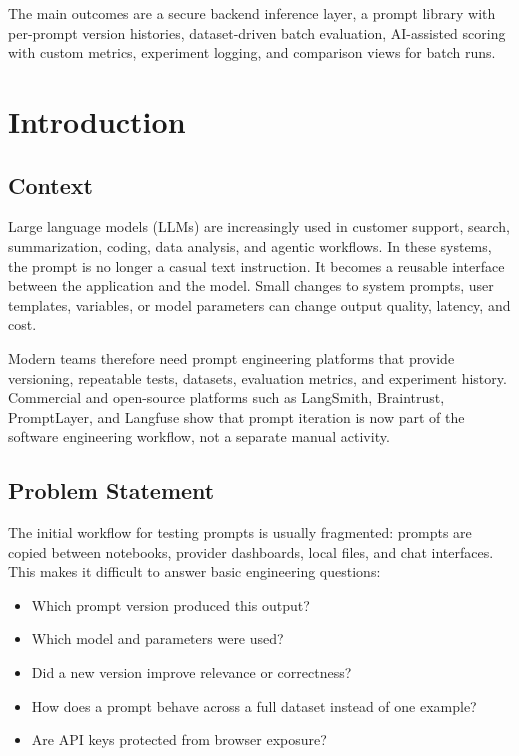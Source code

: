 \documentclass[12pt,a4paper]{report}
\begin{document}
The main outcomes are a secure backend inference layer, a prompt library with per-prompt version histories, dataset-driven batch evaluation, AI-assisted scoring with custom metrics, experiment logging, and comparison views for batch runs.

\tableofcontents
\listoffigures
\listoftables
\clearpage
{}

\chapter{Introduction}

\section{Context}
Large language models (LLMs) are increasingly used in customer support, search, summarization, coding, data analysis, and agentic workflows. In these systems, the prompt is no longer a casual text instruction. It becomes a reusable interface between the application and the model. Small changes to system prompts, user templates, variables, or model parameters can change output quality, latency, and cost.

Modern teams therefore need prompt engineering platforms that provide versioning, repeatable tests, datasets, evaluation metrics, and experiment history. Commercial and open-source platforms such as LangSmith, Braintrust, PromptLayer, and Langfuse show that prompt iteration is now part of the software engineering workflow, not a separate manual activity.

\section{Problem Statement}
The initial workflow for testing prompts is usually fragmented: prompts are copied between notebooks, provider dashboards, local files, and chat interfaces. This makes it difficult to answer basic engineering questions:
\begin{itemize}
  \item Which prompt version produced this output?
  \item Which model and parameters were used?
  \item Did a new version improve relevance or correctness?
  \item How does a prompt behave across a full dataset instead of one example?
  \item Are API keys protected from browser exposure?
\end{itemize}
\end{document}
